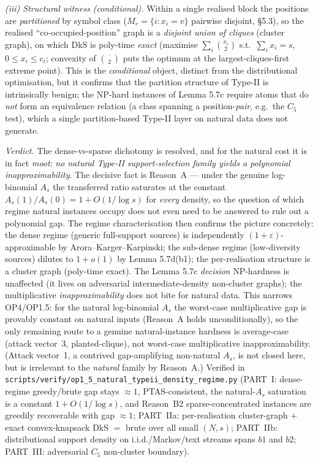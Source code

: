\documentclass[
]{article}
\begin{document}
\emph{(iii) Structural witness (conditional).} Within a single realised
block the positions are \emph{partitioned} by symbol class ($M_v = \{i : x_i
= v\}$ pairwise disjoint, §5.3), so the realised ``co-occupied-position''
graph is a \emph{disjoint union of cliques} (cluster graph), on which DkS is
poly-time \emph{exact} (maximise $\sum_i \binom{x_i}{2}$ s.t.\ $\sum_i x_i =
s$, $0 \le x_i \le c_i$; convexity of $\binom{\cdot}{2}$ puts the optimum at
the largest-cliques-first extreme point). This is the \emph{conditional}
object, distinct from the distributional optimisation, but it confirms that
the partition structure of Type-II is intrinsically benign; the NP-hard
instances of Lemma 5.7c require atoms that do \emph{not} form an equivalence
relation (a class spanning a position-\emph{pair}, e.g.\ the $C_5$ test),
which a single partition-based Type-II layer on natural data does not
generate.

\emph{Verdict.} The dense-vs-sparse dichotomy is resolved, and for the
natural cost it is in fact \emph{moot}: \emph{no natural Type-II
support-selection family yields a polynomial inapproximability}. The decisive
fact is Reason~A --- under the genuine log-binomial $A_s$ the transferred
ratio saturates at the constant $A_s(1)/A_s(0) = 1 + O(1/\log s)$ for
\emph{every} density, so the question of which regime natural instances
occupy does not even need to be answered to rule out a polynomial gap. The
regime characterisation then confirms the picture concretely: the dense
regime (generic full-support sources) is independently
$(1+\varepsilon)$-approximable by Arora--Karger--Karpinski; the sub-dense
regime (low-diversity sources) dilutes to $1 + o(1)$ by Lemma 5.7d(b1); the
per-realisation structure is a cluster graph (poly-time exact). The Lemma
5.7c \emph{decision} NP-hardness is unaffected (it lives on adversarial
intermediate-density non-cluster graphs); the multiplicative
\emph{inapproximability} does not bite for natural data. This narrows
OP4/OP1.5: for the natural log-binomial $A_s$ the worst-case multiplicative
gap is provably constant on natural inputs (Reason~A holds unconditionally),
so the only remaining route to a genuine natural-instance hardness is
average-case (attack vector~3, planted-clique), not worst-case multiplicative
inapproximability. (Attack vector~1, a contrived gap-amplifying non-natural
$A_s$, is not closed here, but is irrelevant to the \emph{natural} family by
Reason~A.) Verified in
\texttt{scripts/verify/op1\_5\_natural\_typeii\_density\_regime.py} (PART~I:
dense-regime greedy/brute gap stays $\approx 1$, PTAS-consistent, the
natural-$A_s$ saturation is a constant $1 + O(1/\log s)$, and Reason~B2
sparse-concentrated instances are greedily recoverable with gap $\approx 1$;
PART~IIa: per-realisation cluster-graph + exact convex-knapsack DkS $=$ brute
over all small $(N,s)$; PART~IIb: distributional support density on
i.i.d./Markov/text streams spans $b1$ and $b2$; PART~III: adversarial $C_5$
non-cluster boundary).
\end{document}
